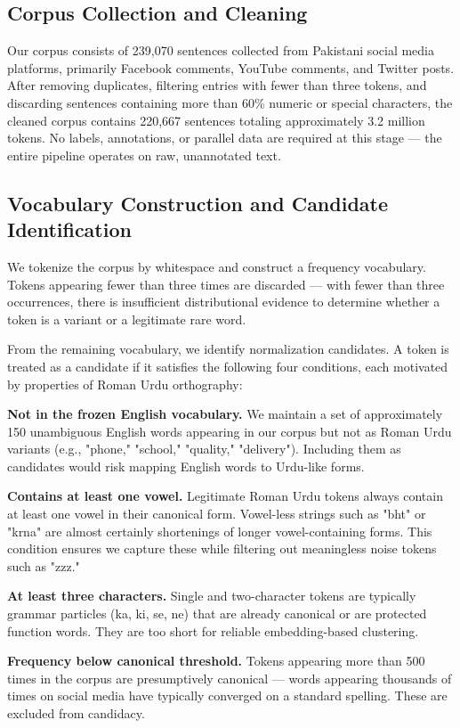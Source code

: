 \documentclass[11pt]{article}
\begin{document}
\subsection{Corpus Collection and Cleaning}
Our corpus consists of 239,070 sentences collected from Pakistani social media platforms, primarily Facebook comments, YouTube comments, and Twitter posts. After removing duplicates, filtering entries with fewer than three tokens, and discarding sentences containing more than 60\% numeric or special characters, the cleaned corpus contains 220,667 sentences totaling approximately 3.2 million tokens. No labels, annotations, or parallel data are required at this stage — the entire pipeline operates on raw, unannotated text.

\subsection{Vocabulary Construction and Candidate Identification}
We tokenize the corpus by whitespace and construct a frequency vocabulary. Tokens appearing fewer than three times are discarded — with fewer than three occurrences, there is insufficient distributional evidence to determine whether a token is a variant or a legitimate rare word.

From the remaining vocabulary, we identify normalization candidates. A token is treated as a candidate if it satisfies the following four conditions, each motivated by properties of Roman Urdu orthography:

\textbf{Not in the frozen English vocabulary.} We maintain a set of approximately 150 unambiguous English words appearing in our corpus but not as Roman Urdu variants (e.g., "phone," "school," "quality," "delivery"). Including them as candidates would risk mapping English words to Urdu-like forms.

\textbf{Contains at least one vowel.} Legitimate Roman Urdu tokens always contain at least one vowel in their canonical form. Vowel-less strings such as "bht" or "krna" are almost certainly shortenings of longer vowel-containing forms. This condition ensures we capture these while filtering out meaningless noise tokens such as "zzz."

\textbf{At least three characters.} Single and two-character tokens are typically grammar particles (ka, ki, se, ne) that are already canonical or are protected function words. They are too short for reliable embedding-based clustering.

\textbf{Frequency below canonical threshold.} Tokens appearing more than 500 times in the corpus are presumptively canonical — words appearing thousands of times on social media have typically converged on a standard spelling. These are excluded from candidacy.
\end{document}
